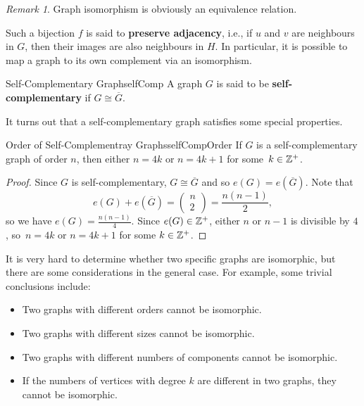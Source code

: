 \documentclass[math, code]{amznotes}
\theoremstyle{remark}
\newtheorem*{remark}{Remark}
\begin{document}
\begin{notebox}
    \begin{remark}
        Graph isomorphism is obviously an equivalence relation.
    \end{remark}
\end{notebox}
Such a bijection $f$ is said to \textbf{preserve adjacency}, i.e., if $u$ and $v$ are neighbours in $G$, then their images are also neighbours in $H$. In particular, it is possible to map a graph to its own complement via an isomorphism.
\begin{dfnbox}{Self-Complementary Graph}{selfComp}
    A graph $G$ is said to be {\color{red} \textbf{self-complementary}} if $G \cong \overline{G}$.
\end{dfnbox}
It turns out that a self-complementary graph satisfies some special properties.
\begin{probox}{Order of Self-Complementray Graphs}{selfCompOrder}
    If $G$ is a self-complementary graph of order $n$, then either $n = 4k$ or $n = 4k + 1$ for some~$k \in \mathbb{Z}^+$.
    \tcblower
    \begin{proof}
        Since $G$ is self-complementary, $G \cong \overline{G}$ and so $e(G) = e\left(\overline{G}\right)$. Note that
        \begin{equation*}
            e(G) + e\left(\overline{G}\right) = \begin{pmatrix}
                n \\
                2
            \end{pmatrix} = \frac{n(n - 1)}{2},
        \end{equation*}
        so we have $e(G) = \frac{n(n - 1)}{4}$. Since $e(G) \in \mathbb{Z}^+$, either $n$ or $n - 1$ is divisible by $4$, so~$n = 4k$ or $n = 4k + 1$ for some $k \in \mathbb{Z}^+$.
    \end{proof}
\end{probox}
It is very hard to determine whether two specific graphs are isomorphic, but there are some considerations in the general case. For example, some trivial conclusions include:
\begin{itemize}
    \item Two graphs with different orders cannot be isomorphic.
    \item Two graphs with different sizes cannot be isomorphic.
    \item Two graphs with different numbers of components cannot be isomorphic.
    \item If the numbers of vertices with degree $k$ are different in two graphs, they cannot be isomorphic.
\end{itemize}
\end{document}
